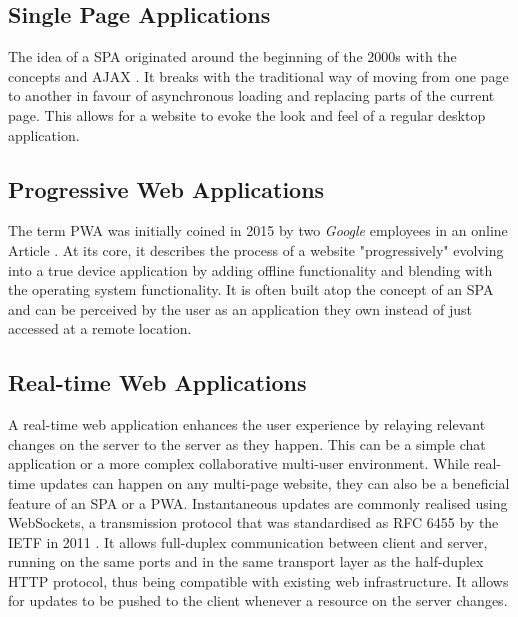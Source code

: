 \subsection{Single Page Applications}

The idea of a \ac{SPA} originated around the beginning of the 2000s with the concepts  \parencite{innerBrowsing} and \ac{AJAX} \parencite{ajaxNewApproach}. It breaks with the traditional way of moving from one page to another in favour of asynchronous loading and replacing parts of the current page. This allows for a website to evoke the look and feel of a regular desktop application.

\subsection{Progressive Web Applications}

The term \ac{PWA} was initially coined in 2015 by two \emph{Google} employees in an online Article \parencite{progressiveWebApplications}. At its core, it describes the process of a website "progressively" evolving into a true device application by adding offline functionality and blending with the operating system functionality. It is often built atop the concept of an \ac{SPA} and can be perceived by the user as an application they own instead of just accessed at a remote location.

\subsection{Real-time Web Applications}

A real-time web application enhances the user experience by relaying relevant changes on the server to the server as they happen. This can be a simple chat application or a more complex collaborative multi-user environment. While real-time updates can happen on any multi-page website, they can also be a beneficial feature of an \ac{SPA} or a \ac{PWA}. Instantaneous updates are commonly realised using WebSockets, a transmission protocol that was standardised as \ac{RFC} 6455 by the \ac{IETF} in 2011 \parencite{webSocketsProtocolRfc}. It allows full-duplex communication between client and server, running on the same ports and in the same transport layer as the half-duplex \ac{HTTP} protocol, thus being compatible with existing web infrastructure. It allows for updates to be pushed to the client whenever a resource on the server changes.



